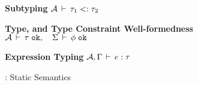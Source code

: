 \renewcommand{\rgn}{r}
\renewcommand{\rbar}{\overline{r}}

\begin{figure*}[!h]
%
\textbf{Subtyping}  \; \fbox
  {\({\mathcal{A}}\,\vdash\,\tau_1 <: \tau_2\)}\\

%
\bigskip

\textbf{Type, and Type Constraint Well-formedness}  \; \fbox
  {\({\mathcal{A}}\,\vdash\,\tau \; \texttt{ok}, \quad 
     \Sigma\,\vdash\,\phi \; \texttt{ok}\)}\\

%
\bigskip

\textbf{Expression Typing}  \; \fbox
  {\({\mathcal{A}},\Gamma\,\vdash\,e:\tau\)}\\

%
\bigskip

\caption{\fbname: Static Semantics}
\label{fig:fb-staticsem}
\end{figure*}

\renewcommand{\rgn}{\pi}
\renewcommand{\rbar}{\overline{\pi}}
